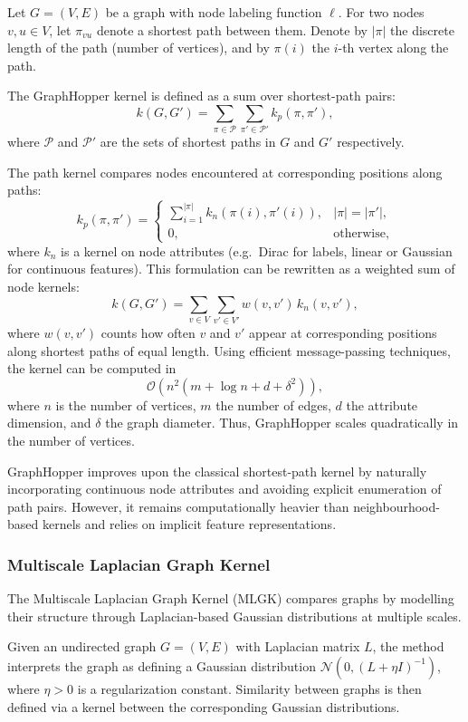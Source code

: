 Let $G=(V,E)$ be a graph with node labeling
function $\ell$.
For two nodes $v,u \in V$, let
$\pi_{vu}$ denote a shortest path between them.
Denote by $|\pi|$ the discrete length of the path
(number of vertices), and by $\pi(i)$ the $i$-th
vertex along the path.

The GraphHopper kernel is defined as a sum over
shortest-path pairs:
\[
k(G,G')
=
\sum_{\pi \in \mathcal{P}}
\sum_{\pi' \in \mathcal{P}'}
k_p(\pi,\pi'),
\]
where $\mathcal{P}$ and $\mathcal{P}'$ are the
sets of shortest paths in $G$ and $G'$ respectively.

The path kernel compares nodes encountered at
corresponding positions along paths:
\[
k_p(\pi,\pi')
=
\begin{cases}
\sum_{i=1}^{|\pi|}
k_n(\pi(i),\pi'(i)), & |\pi| = |\pi'|, \\
0, & \text{otherwise},
\end{cases}
\]
where $k_n$ is a kernel on node attributes
(e.g.\ Dirac for labels, linear or Gaussian for
continuous features).
This formulation can be rewritten as a weighted
sum of node kernels:
\[
k(G,G')
=
\sum_{v \in V}
\sum_{v' \in V'}
w(v,v')\, k_n(v,v'),
\]
where $w(v,v')$ counts how often $v$ and $v'$
appear at corresponding positions along shortest
paths of equal length.
Using efficient message-passing techniques,
the kernel can be computed in
\[
\mathcal{O}\!\left(n^2 (m + \log n + d + \delta^2)\right),
\]
where $n$ is the number of vertices,
$m$ the number of edges,
$d$ the attribute dimension,
and $\delta$ the graph diameter.
Thus, GraphHopper scales quadratically
in the number of vertices.

GraphHopper improves upon the classical
shortest-path kernel by naturally incorporating
continuous node attributes and avoiding
explicit enumeration of path pairs.
However, it remains computationally heavier
than neighbourhood-based kernels and
relies on implicit feature representations.


\subsubsection{Multiscale Laplacian Graph Kernel}
\label{sec:theory:multiscale_laplacian}

The Multiscale Laplacian Graph Kernel (MLGK)
\citep{kondor2016multiscalelaplaciangraphkernel}
compares graphs by modelling their structure
through Laplacian-based Gaussian distributions
at multiple scales.

Given an undirected graph $G=(V,E)$ with
Laplacian matrix $L$, the method interprets
the graph as defining a Gaussian distribution
$\mathcal{N}(0, (L+\eta I)^{-1})$,
where $\eta>0$ is a regularization constant.
Similarity between graphs is then defined
via a kernel between the corresponding
Gaussian distributions.

